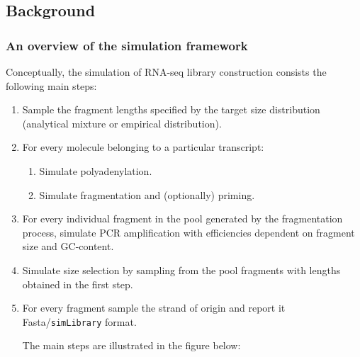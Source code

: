 \subsection{Background}

\subsubsection{An overview of the simulation framework}
\label{sss:framework}

Conceptually, the simulation of RNA-seq library construction consists the following main steps:

\begin{enumerate}
\item{Sample the fragment lengths specified by the target size distribution (analytical mixture or empirical distribution).}
\item{For every molecule belonging to a particular transcript:
    \begin{enumerate}[label=\emph{\alph*})]
        \item Simulate polyadenylation.
        \item Simulate fragmentation and (optionally) priming.
    \end{enumerate}
}
\item{For every individual fragment in the pool generated by the fragmentation process, simulate PCR amplification with efficiencies dependent on fragment size and GC-content.}
\item{Simulate size selection by sampling from the pool fragments with lengths obtained in the first step.}
\item{For every fragment sample the strand of origin and report it Fasta/{\tt simLibrary} \cite{simngs} format.}

The main steps are illustrated in the figure below:


\end{enumerate}
